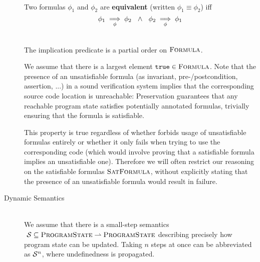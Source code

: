 \begin{description}
    \begin{definition}~\\
        Two formulas $\phi_1$ and $\phi_2$ are \textbf{equivalent} (written $\phi_1 \equiv \phi_2$) iff
        \begin{displaymath}
        {\phi_1} \underset{\phi}{\implies} {\phi_2} ~~\wedge~~ {\phi_2} \underset{\phi}{\implies} {\phi_1}
        \end{displaymath}
    \end{definition} 
    
    
    \begin{lemma}~\\
        The implication predicate is a partial order on $\textsc{Formula}$.
    \end{lemma}
    
    We assume that there is a largest element $\texttt{true} \in \textsc{Formula}$.
    Note that the presence of an unsatisfiable formula (as invariant, pre-/postcondition, assertion, ...) in a sound verification system implies that the corresponding source code location is unreachable:
    Preservation guarantees that any reachable program state satisfies potentially annotated formulas, trivially ensuring that the formula is satisfiable.
    
    This property is true regardless of whether \gsvl forbids usage of unsatisfiable formulas entirely or whether it only fails when trying to use the corresponding code (which would involve proving that a satisfiable formula implies an unsatisfiable one).
    Therefore we will often restrict our reasoning on the satisfiable formulas $\textsc{SatFormula}$, without explicitly stating that the presence of an unsatisfiable formula would result in failure.
    
    
\item[Dynamic Semantics]~\\
    We assume that there is a small-step semantics $~\mathcal{S} \subseteq \textsc{ProgramState} \rightharpoonup \textsc{ProgramState}$ describing precisely how program state can be updated.
    Taking $n$ steps at once can be abbreviated as $\mathcal{S}^n$, where undefinedness is propagated.
    

\end{description}
